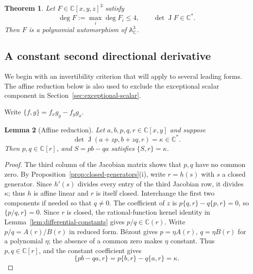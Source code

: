 \documentclass[11pt,reqno]{amsart}
\numberwithin{equation}{section}
\theoremstyle{plain}
\newtheorem{theorem}{Theorem}[section]
\newtheorem{lemma}[theorem]{Lemma}
\theoremstyle{definition}
\theoremstyle{remark}
\newcommand{\C}{\mathbb C}
\newcommand{\A}{\mathbb A}
\newcommand{\J}{\operatorname J}
\begin{document}
\begin{theorem}\label{thm:main}
Let $F\in\C[x,y,z]^3$ satisfy
\[
\deg F:=\max_i\deg F_i\le4,
\qquad \det\J F\in\C^*.
\]
Then $F$ is a polynomial automorphism of $\A^3_\C$.
\end{theorem}

\subsection{A constant second directional derivative}\label{sec:direction}
We begin with an invertibility criterion that will apply to several leading
forms. The affine reduction below is also used to exclude the exceptional
scalar component in Section~\ref{sec:exceptional-scalar}.

Write $\{f,g\}=f_xg_y-f_yg_x$.
\begin{lemma}[Affine reduction]\label{lem:affine-reduction}
Let $a,b,p,q,r\in\C[x,y]$ and suppose
\[
\det\J(a+zp,b+zq,r)=\kappa\in\C^*.
\]
Then $p,q\in\C[r]$, and $S=pb-qa$ satisfies $\{S,r\}=\kappa$.
\end{lemma}
\begin{proof}
The third column of the Jacobian matrix shows that $p,q$ have no common zero.
By Proposition~\ref{prop:closed-generators}(i), write $r=h(s)$ with
$s$ a closed generator.
Since $h'(s)$ divides every entry of the third Jacobian row, it divides $\kappa$;
thus $h$ is affine linear and $r$ is itself closed.
Interchange the first two components if needed so that $q\ne0$.
The coefficient of $z$ is $p\{q,r\}-q\{p,r\}=0$, so $\{p/q,r\}=0$.
Since $r$ is closed, the rational-function kernel identity in
Lemma~\ref{lem:differential-constants} gives $p/q\in\C(r)$.
Write $p/q=A(r)/B(r)$ in reduced form. B\'ezout gives $p=\eta A(r)$, $q=\eta B(r)$ for a polynomial $\eta$; the absence of a common zero makes $\eta$ constant.
Thus $p,q\in\C[r]$, and the constant coefficient gives
\[
\{pb-qa,r\}=p\{b,r\}-q\{a,r\}=\kappa.
\]
\end{proof}
\end{document}
